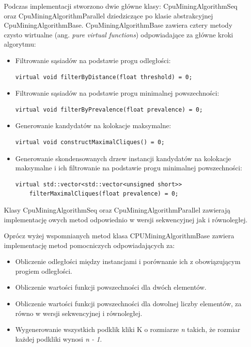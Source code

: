 \documentclass[12pt]{article}
\newcounter{algorytm}
\begin{document}
Podczas implementacji stworzono dwie główne klasy: CpuMiningAlgorithmSeq oraz CpuMiningAlgorithmParallel dziedziczące po klasie abstrakcyjnej CpuMiningAlgorithmBase. CpuMiningAlgorithmBase zawiera cztery metody czysto wirtualne (ang. \textit{pure virtual functions}) odpowiadające za główne kroki algorytmu:

\begin{itemize}
\item
Filtrowanie sąsiadów na podstawie progu odległości:
\begin{lstlisting}
virtual void filterByDistance(float threshold) = 0;
\end{lstlisting}

\item
Filtrowanie sąsiadów na podstawie progu minimalnej powszechności:
\begin{lstlisting}
virtual void filterByPrevalence(float prevalence) = 0;
\end{lstlisting}

\item
Generowanie kandydatów na kolokacje maksymalne:
\begin{lstlisting}
virtual void constructMaximalCliques() = 0;
\end{lstlisting}

\item
Generowanie skondensowanych drzew instancji kandydatów na kolokacje maksymalne i ich filtrowanie na podstawie progu minimalnej powszechności:
\begin{lstlisting}
virtual std::vector<std::vector<unsigned short>> 
    filterMaximalCliques(float prevalence) = 0;
\end{lstlisting}
\end{itemize}

Klasy CpuMiningAlgorithmSeq oraz CpuMiningAlgorithmParallel zawierają implementację owych metod odpowiednio w wersji sekwencyjnej jak i równoległej.

Oprócz wyżej wspomnianych metod klasa CPUMiningAlgorithmBase zawiera implementację metod pomocniczych odpowiadających za:

\begin{itemize}
\item Obliczenie odległości między instancjami i porównanie ich z obowiązującym progiem odległości.
\item Obliczenie wartości funkcji powszechności dla dwóch elementów.
\item Obliczenie wartości funkcji powszechności dla dowolnej liczby elementów, za równo w wersji sekwencyjnej i równoległej.
\item Wygenerowanie wszystkich podklik kliki K o rozmiarze \textit{n} takich, że rozmiar każdej podkliki wynosi \textit{n - 1}.
\end{itemize}
\end{document}

